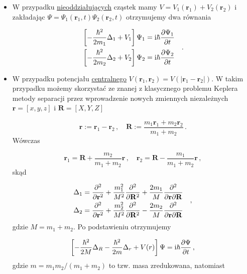 \documentclass{myclass}
\begin{document}
\begin{itemize}

\item W przypadku \underline{nieoddziałujących} cząstek mamy
\(V=V_1(\mathbf{r}_1)+V_2(\mathbf{r}_2)\) i zakładając
\(\Psi=\Psi_1(\mathbf{r}_1,t)\Psi_2(\mathbf{r}_2,t)\) otrzymujemy dwa równania

\begin{equation*}
    \begin{split}
        &\left[-\frac{\hbar^2}{2m_1}\Delta_1+V_1\right]\Psi_1=\mathrm{i}\hbar\pdv{\Psi_1}{t}\\
        &\left[-\frac{\hbar^2}{2m_2}\Delta_2+V_2\right]\Psi_2=\mathrm{i}\hbar\pdv{\Psi_2}{t}
    \end{split}\quad.
\end{equation*}

\item W przypadku potencjału \underline{centralnego}
\(V(\mathbf{r}_1,\mathbf{r}_2)=V(|\mathbf{r}_1-\mathbf{r}_2|)\). W takim przypadku możemy skorzystać
ze znanej z klasycznego problemu Keplera metody separacji przez wprowadzenie nowych zmiennych
niezależnych \(\mathbf{r}=[x,y,z]\) i \(\mathbf{R}=[X,Y,Z]\)

\begin{equation*}
    \mathbf{r}:=\mathbf{r}_1-\mathbf{r}_2\,,\quad \mathbf{R}:=\frac{m_1\mathbf{r}_1+m_2\mathbf{r}_2}{m_1+m_2}\,.
\end{equation*}
Wówczas

\begin{equation*}
    \mathbf{r}_1=\mathbf{R}+\frac{m_2}{m_1+m_2}\mathbf{r}\,,\quad \mathbf{r}_2=\mathbf{R}-\frac{m_1}{m_1+m_2}\mathbf{r}\,,
\end{equation*}
skąd

\begin{equation*}
\begin{split}
    &\Delta_1=\pdv[2]{ }{\mathbf{r}}+\frac{m_1^2}{M^2}\pdv[2]{ }{\mathbf{R}}+\frac{2m_1}{M}\frac{\partial^2}{\partial \mathbf{r}\partial \mathbf{R}}\\
    &\Delta_2=\pdv[2]{ }{\mathbf{r}}+\frac{m_2^2}{M^2}\pdv[2]{ }{\mathbf{R}}-\frac{2m_2}{M}\frac{\partial^2}{\partial\mathbf{r}\partial \mathbf{R}}
\end{split}\quad,
\end{equation*}
gdzie \(M=m_1+m_2\). Po podstawieniu otrzymujemy

\begin{equation*}
    \left[-\frac{\hbar^2}{2M}\Delta_R-\frac{\hbar^2}{2m}\Delta_r+V(r)\right]\Psi=\mathrm{i}\hbar\pdv{\Psi}{t}\,,
\end{equation*}
gdzie \(m=m_1m_2/(m_1+m_2)\) to tzw. masa zredukowana, natomiast


\end{itemize}
\end{document}
